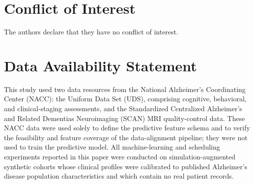 \documentclass[11pt,a4paper]{article}
\begin{document}
%
%

\section*{Conflict of Interest}
The authors declare that they have no conflict of interest.

\section*{Data Availability Statement}
This study used two data resources from the National Alzheimer's Coordinating
Center (NACC): the Uniform Data Set (UDS), comprising cognitive, behavioral, and
clinical-staging assessments, and the Standardized Centralized Alzheimer's and
Related Dementias Neuroimaging (SCAN) MRI quality-control data. These NACC data
were used solely to define the predictive feature schema and to verify the
feasibility and feature coverage of the data-alignment pipeline; they were not
used to train the predictive model. All machine-learning and scheduling
experiments reported in this paper were conducted on simulation-augmented
synthetic cohorts whose clinical profiles were calibrated to published
Alzheimer's disease population characteristics and which contain no real patient
records.


\end{document}
